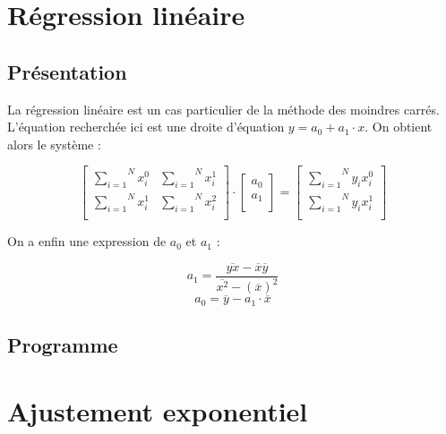 \documentclass{report}
\begin{document}
    \section{Régression linéaire}
      \subsection{Présentation}
	La régression linéaire est un cas particulier de la méthode des moindres carrés. L'équation recherchée ici est une droite d'équation $y=a_{0} + a_{1} \cdot x$. On obtient alors le système :
	
	\begin{equation*}
	  \begin{bmatrix}
	    \overset{N}{\underset{i=1}{\sum}} x_{i}^{0} & \overset{N}{\underset{i=1}{\sum}} x_{i}^{1} \\
	    \overset{N}{\underset{i=1}{\sum}} x_{i}^{1} & \overset{N}{\underset{i=1}{\sum}} x_{i}^{2} \\
	  \end{bmatrix}
	  \cdot
	  \begin{bmatrix}
	    a_{0} \\
	    a_{1} \\
	  \end{bmatrix}
	  =
	  \begin{bmatrix}
	    \overset{N}{\underset{i=1}{\sum}} y_{i} x_{i}^{0} \\
	    \overset{N}{\underset{i=1}{\sum}} y_{i} x_{i}^{1} \\
	  \end{bmatrix}
	\end{equation*}
	
	On a enfin une expression de $a_{0}$ et $a_{1}$ :
	
	\begin{displaymath}
	  a_{1} = \frac{\overline{yx}-\overline{x}\overline{y}}{\overline{x^{2}}-(\overline{x})^2}
	\end{displaymath}
	\vspace{0.1 cm}
	\begin{displaymath}
	  a_{0} = \overline{y} - a_{1} \cdot \overline{x}
	\end{displaymath}
      \subsection{Programme}
	
    \newpage
    \section{Ajustement exponentiel}
\end{document}
